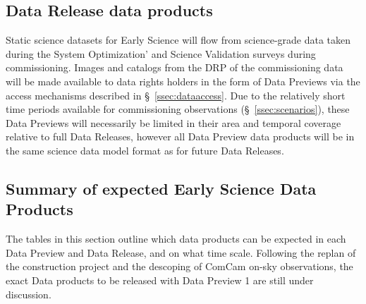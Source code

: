 %
%
%

\subsection{Data Release data products}

Static science datasets for Early Science will flow from science-grade data taken during the System Optimization' and Science Validation surveys during commissioning.
Images and catalogs from the DRP of the commissioning data will be made available to data rights holders in the form of Data Previews via the access mechanisms described in \S~\ref{ssec:dataaccess}.
Due to the relatively short time periods available for commissioning observations (\S~\ref{ssec:scenarios}), these Data Previews will necessarily be limited in their area and temporal coverage relative to full Data Releases, however all Data Preview data products will be in the same science data model format as for future Data Releases.

\subsection{Summary of expected Early Science Data Products} \label{ssec:dataproductsummary}
The tables in this section outline which data products can be expected in each Data Preview and Data Release, and on what time scale. 
Following the replan of the construction project and the descoping of ComCam on-sky observations, the exact Data products to be released with Data Preview 1 are still under discussion. 

